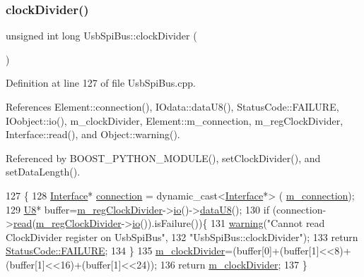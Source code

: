 \subsubsection{\texorpdfstring{clock\+Divider()}{clockDivider()}}
{\footnotesize\ttfamily unsigned int long Usb\+Spi\+Bus\+::clock\+Divider (\begin{DoxyParamCaption}{ }\end{DoxyParamCaption})}



Definition at line 127 of file Usb\+Spi\+Bus.\+cpp.



References Element\+::connection(), I\+Odata\+::data\+U8(), Status\+Code\+::\+F\+A\+I\+L\+U\+RE, I\+Oobject\+::io(), m\+\_\+clock\+Divider, Element\+::m\+\_\+connection, m\+\_\+reg\+Clock\+Divider, Interface\+::read(), and Object\+::warning().



Referenced by B\+O\+O\+S\+T\+\_\+\+P\+Y\+T\+H\+O\+N\+\_\+\+M\+O\+D\+U\+L\+E(), set\+Clock\+Divider(), and set\+Data\+Length().


\begin{DoxyCode}
127                                          \{
128   \hyperlink{classInterface}{Interface}* \hyperlink{classElement_af57444353c1ddf9fa0109801e97debf7}{connection} = \textcolor{keyword}{dynamic\_cast<}\hyperlink{classInterface}{Interface}*\textcolor{keyword}{>} (
      \hyperlink{classElement_abe3de7a5dbbc9a6dd2d7e012e5fdb266}{m\_connection});
129   \hyperlink{ICECALv3_8h_a3cb25ca6f51f003950f9625ff05536fc}{U8}* buffer=\hyperlink{classUsbSpiBus_abfd5f040a0a8c19d972b26ea581bf1f0}{m\_regClockDivider}->\hyperlink{classIOobject_af04fb94137c3d86849f478ac5afab5d1}{io}()->\hyperlink{classIOdata_a75e9c318dbac3a39402179070943d4bc}{dataU8}();
130   \textcolor{keywordflow}{if} (connection->\hyperlink{classInterface_a99136b67c8e6cbcaa0477c36940ac2ef}{read}(\hyperlink{classUsbSpiBus_abfd5f040a0a8c19d972b26ea581bf1f0}{m\_regClockDivider}->\hyperlink{classIOobject_af04fb94137c3d86849f478ac5afab5d1}{io}()).isFailure())\{
131     \hyperlink{classObject_a65cd4fda577711660821fd2cd5a3b4c9}{warning}(\textcolor{stringliteral}{"Cannot read ClockDivider register on UsbSpiBus"},
132         \textcolor{stringliteral}{"UsbSpiBus::clockDivider"});
133     \textcolor{keywordflow}{return} \hyperlink{classStatusCode_a6f565cbeadc76d14c72f047e5e85eb4ba3da73d4c469762eb9d3c960368252b26}{StatusCode::FAILURE};
134   \} 
135   \hyperlink{classUsbSpiBus_a5a4de2b61018f52b885559ce07bd3161}{m\_clockDivider}=(buffer[0]+(buffer[1]<<8)+(buffer[1]<<16)+(buffer[1]<<24));
136   \textcolor{keywordflow}{return} \hyperlink{classUsbSpiBus_a5a4de2b61018f52b885559ce07bd3161}{m\_clockDivider};
137 \}
\end{DoxyCode}
\mbox{\label{classElement_af57444353c1ddf9fa0109801e97debf7}} 
